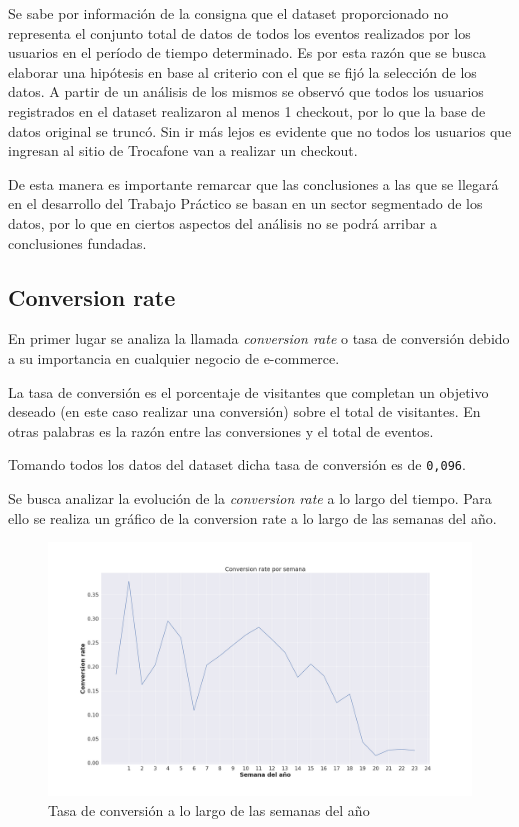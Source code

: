 \documentclass[a4paper]{article}
\begin{document}
Se sabe por información de la consigna que el dataset proporcionado no representa el conjunto total de datos de todos los eventos realizados por los usuarios en el período de tiempo determinado. Es por esta razón que se busca elaborar una hipótesis en base al criterio con el que se fijó la selección de los datos. A partir de un análisis de los mismos se observó que todos los usuarios registrados en el dataset realizaron al menos 1 checkout, por lo que la base de datos original se truncó. Sin ir más lejos es evidente que no todos los usuarios que ingresan al sitio de Trocafone van a realizar un checkout.

De esta manera es importante remarcar que las conclusiones a las que se llegará en el desarrollo del Trabajo Práctico se basan en un sector segmentado de los datos, por lo que en ciertos aspectos del análisis no se podrá arribar a conclusiones fundadas.

\subsection{Conversion rate}

En primer lugar se analiza la llamada \textit{conversion rate} o tasa de conversión debido a su importancia en cualquier negocio de e-commerce.

La tasa de conversión es el porcentaje de visitantes que completan un objetivo deseado (en este caso realizar una conversión) sobre el total de visitantes. En otras palabras es la razón entre las conversiones y el total de eventos.

Tomando todos los datos del dataset dicha tasa de conversión es de \texttt{0,096}. 
	
Se busca analizar la evolución de la \textit{conversion rate} a lo largo del tiempo. Para ello se realiza un gráfico de la conversion rate a lo largo de las semanas del año.

\begin{figure}[h!]
	\includegraphics[width=\textwidth]{figures/010-conversion_rate_semana-lineplot.png}
	\caption{Tasa de conversión a lo largo de las semanas del año}
	\label{fig:conversionrate}
\end{figure}
\end{document}

